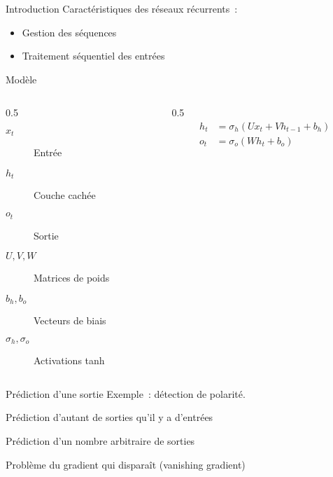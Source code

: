 \begin{frame}{Introduction}
  Caractéristiques des réseaux récurrents~:

  \begin{itemize}[<+->]
    \item Gestion des séquences
    \item Traitement séquentiel des entrées
  \end{itemize}
\end{frame}

\begin{frame}{Modèle}

  \begin{columns}
    \begin{column}{0.5\tw}
      \begin{description}
        \item[$x_t$] Entrée
        \item[$h_t$] Couche cachée
        \item[$o_t$] Sortie
        \item[$U, V, W$] Matrices de poids
        \item[$b_h, b_o$] Vecteurs de biais
        \item[$\sigma_h, \sigma_o$] Activations tanh
      \end{description}
    \end{column}
    \begin{column}{0.5\tw}
      \begin{align*}
      h_t & = \sigma_h(U x_t + V h_{t - 1} + b_h) \\
      o_t & = \sigma_o(W h_t + b_o) \\
      \end{align*}
    \end{column}
  \end{columns}
\end{frame}

\begin{frame}{Prédiction d'une sortie}
  Exemple~: détection de polarité.

  \begin{figure}
    \centering
  \end{figure}
\end{frame}

\begin{frame}{Prédiction d'autant de sorties qu'il y a d'entrées}
\end{frame}

\begin{frame}{Prédiction d'un nombre arbitraire de sorties}
\end{frame}

\begin{frame}{Problème du gradient qui disparaît (vanishing gradient)}
\end{frame}
